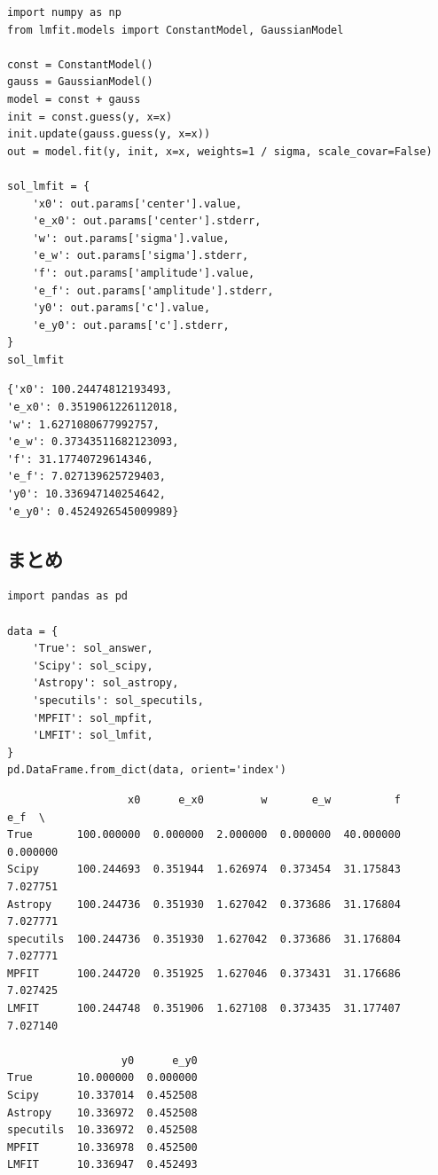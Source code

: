 \documentclass[a4paper, 8pt, notitlepage, uplatex, dvipdfmx]{jsarticle}
\begin{document}
\begin{verbatim}
import numpy as np
from lmfit.models import ConstantModel, GaussianModel

const = ConstantModel()
gauss = GaussianModel()
model = const + gauss
init = const.guess(y, x=x)
init.update(gauss.guess(y, x=x))
out = model.fit(y, init, x=x, weights=1 / sigma, scale_covar=False)

sol_lmfit = {
    'x0': out.params['center'].value,
    'e_x0': out.params['center'].stderr,
    'w': out.params['sigma'].value,
    'e_w': out.params['sigma'].stderr,
    'f': out.params['amplitude'].value,
    'e_f': out.params['amplitude'].stderr,
    'y0': out.params['c'].value,
    'e_y0': out.params['c'].stderr,
}
sol_lmfit
\end{verbatim}

\label{}
\begin{verbatim}
{'x0': 100.24474812193493,
'e_x0': 0.3519061226112018,
'w': 1.6271080677992757,
'e_w': 0.37343511682123093,
'f': 31.17740729614346,
'e_f': 7.027139625729403,
'y0': 10.336947140254642,
'e_y0': 0.4524926545009989}
\end{verbatim}
\subsection{まとめ}
\label{sec:org46c93d9}
\begin{verbatim}
import pandas as pd

data = {
    'True': sol_answer,
    'Scipy': sol_scipy,
    'Astropy': sol_astropy,
    'specutils': sol_specutils,
    'MPFIT': sol_mpfit,
    'LMFIT': sol_lmfit,
}
pd.DataFrame.from_dict(data, orient='index')
\end{verbatim}

\label{}
\begin{verbatim}
                   x0      e_x0         w       e_w          f       e_f  \
True       100.000000  0.000000  2.000000  0.000000  40.000000  0.000000
Scipy      100.244693  0.351944  1.626974  0.373454  31.175843  7.027751
Astropy    100.244736  0.351930  1.627042  0.373686  31.176804  7.027771
specutils  100.244736  0.351930  1.627042  0.373686  31.176804  7.027771
MPFIT      100.244720  0.351925  1.627046  0.373431  31.176686  7.027425
LMFIT      100.244748  0.351906  1.627108  0.373435  31.177407  7.027140

                  y0      e_y0
True       10.000000  0.000000
Scipy      10.337014  0.452508
Astropy    10.336972  0.452508
specutils  10.336972  0.452508
MPFIT      10.336978  0.452500
LMFIT      10.336947  0.452493
\end{verbatim}
\end{document}
